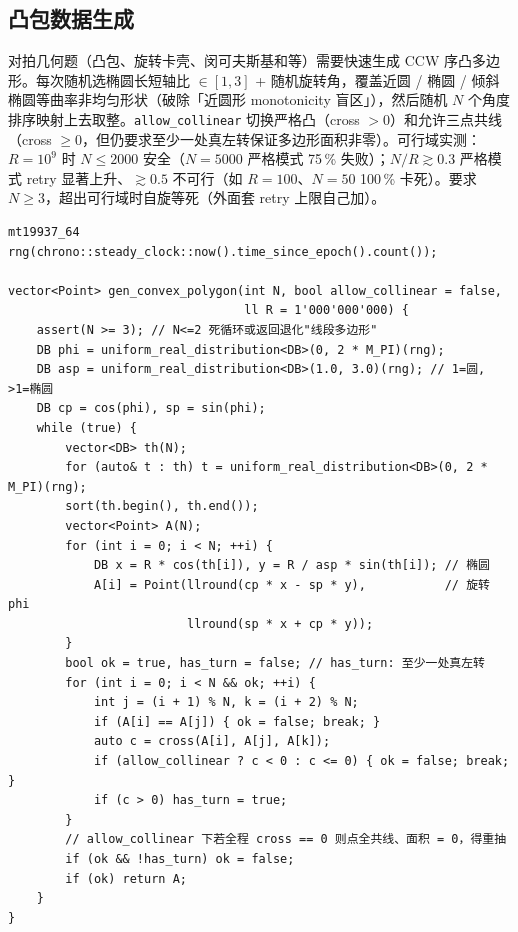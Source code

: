 		\subsection{凸包数据生成}

		对拍几何题（凸包、旋转卡壳、闵可夫斯基和等）需要快速生成 CCW 序凸多边形。每次随机选椭圆长短轴比 $\in [1, 3]$ + 随机旋转角，覆盖近圆 / 椭圆 / 倾斜椭圆等曲率非均匀形状（破除「近圆形 monotonicity 盲区」），然后随机 $N$ 个角度排序映射上去取整。\texttt{allow\_collinear} 切换严格凸（cross $> 0$）和允许三点共线（cross $\ge 0$，但仍要求至少一处真左转保证多边形面积非零）。可行域实测：$R = 10^9$ 时 $N \le 2000$ 安全（$N = 5000$ 严格模式 75\,\% 失败）；$N/R \gtrsim 0.3$ 严格模式 retry 显著上升、$\gtrsim 0.5$ 不可行（如 $R = 100$、$N = 50$ 100\,\% 卡死）。要求 $N \ge 3$，超出可行域时自旋等死（外面套 retry 上限自己加）。

		\begin{verbatim}
mt19937_64 rng(chrono::steady_clock::now().time_since_epoch().count());

vector<Point> gen_convex_polygon(int N, bool allow_collinear = false,
                                 ll R = 1'000'000'000) {
    assert(N >= 3); // N<=2 死循环或返回退化"线段多边形"
    DB phi = uniform_real_distribution<DB>(0, 2 * M_PI)(rng);
    DB asp = uniform_real_distribution<DB>(1.0, 3.0)(rng); // 1=圆, >1=椭圆
    DB cp = cos(phi), sp = sin(phi);
    while (true) {
        vector<DB> th(N);
        for (auto& t : th) t = uniform_real_distribution<DB>(0, 2 * M_PI)(rng);
        sort(th.begin(), th.end());
        vector<Point> A(N);
        for (int i = 0; i < N; ++i) {
            DB x = R * cos(th[i]), y = R / asp * sin(th[i]); // 椭圆
            A[i] = Point(llround(cp * x - sp * y),           // 旋转 phi
                         llround(sp * x + cp * y));
        }
        bool ok = true, has_turn = false; // has_turn: 至少一处真左转
        for (int i = 0; i < N && ok; ++i) {
            int j = (i + 1) % N, k = (i + 2) % N;
            if (A[i] == A[j]) { ok = false; break; }
            auto c = cross(A[i], A[j], A[k]);
            if (allow_collinear ? c < 0 : c <= 0) { ok = false; break; }
            if (c > 0) has_turn = true;
        }
        // allow_collinear 下若全程 cross == 0 则点全共线、面积 = 0，得重抽
        if (ok && !has_turn) ok = false;
        if (ok) return A;
    }
}
		\end{verbatim}
